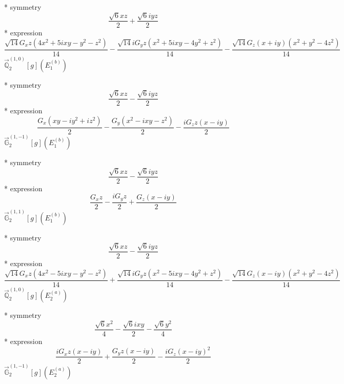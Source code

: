 \documentclass[fleqn,8pt]{jsarticle}
\begin{document}
\noindent\quad ** symmetry
\begin{dmath*}
\frac{\sqrt{6} x z}{2} + \frac{\sqrt{6} i y z}{2}
\end{dmath*}
\noindent\quad ** expression
\begin{dmath*}
\frac{\sqrt{14} G_{x} z \left(4 x^{2} + 5 i x y - y^{2} - z^{2}\right)}{14} - \frac{\sqrt{14} i G_{y} z \left(x^{2} + 5 i x y - 4 y^{2} + z^{2}\right)}{14} - \frac{\sqrt{14} G_{z} \left(x + i y\right) \left(x^{2} + y^{2} - 4 z^{2}\right)}{14}
\end{dmath*}
\noindent\quad $\vec{\mathbb{Q}}_{2}^{(1,0)}[g](E_{1}^{(b)})$

\noindent\quad ** symmetry
\begin{dmath*}
\frac{\sqrt{6} x z}{2} - \frac{\sqrt{6} i y z}{2}
\end{dmath*}
\noindent\quad ** expression
\begin{dmath*}
\frac{G_{x} \left(x y - i y^{2} + i z^{2}\right)}{2} - \frac{G_{y} \left(x^{2} - i x y - z^{2}\right)}{2} - \frac{i G_{z} z \left(x - i y\right)}{2}
\end{dmath*}
\noindent\quad $\vec{\mathbb{G}}_{2}^{(1,-1)}[g](E_{1}^{(b)})$

\noindent\quad ** symmetry
\begin{dmath*}
\frac{\sqrt{6} x z}{2} - \frac{\sqrt{6} i y z}{2}
\end{dmath*}
\noindent\quad ** expression
\begin{dmath*}
\frac{G_{x} z}{2} - \frac{i G_{y} z}{2} + \frac{G_{z} \left(x - i y\right)}{2}
\end{dmath*}
\noindent\quad $\vec{\mathbb{G}}_{2}^{(1,1)}[g](E_{1}^{(b)})$

\noindent\quad ** symmetry
\begin{dmath*}
\frac{\sqrt{6} x z}{2} - \frac{\sqrt{6} i y z}{2}
\end{dmath*}
\noindent\quad ** expression
\begin{dmath*}
\frac{\sqrt{14} G_{x} z \left(4 x^{2} - 5 i x y - y^{2} - z^{2}\right)}{14} + \frac{\sqrt{14} i G_{y} z \left(x^{2} - 5 i x y - 4 y^{2} + z^{2}\right)}{14} - \frac{\sqrt{14} G_{z} \left(x - i y\right) \left(x^{2} + y^{2} - 4 z^{2}\right)}{14}
\end{dmath*}
\noindent\quad $\vec{\mathbb{Q}}_{2}^{(1,0)}[g](E_{2}^{(a)})$

\noindent\quad ** symmetry
\begin{dmath*}
\frac{\sqrt{6} x^{2}}{4} - \frac{\sqrt{6} i x y}{2} - \frac{\sqrt{6} y^{2}}{4}
\end{dmath*}
\noindent\quad ** expression
\begin{dmath*}
\frac{i G_{x} z \left(x - i y\right)}{2} + \frac{G_{y} z \left(x - i y\right)}{2} - \frac{i G_{z} \left(x - i y\right)^{2}}{2}
\end{dmath*}
\noindent\quad $\vec{\mathbb{G}}_{2}^{(1,-1)}[g](E_{2}^{(a)})$
\end{document}
